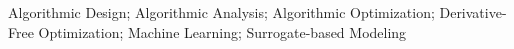\noindent Algorithmic Design; Algorithmic Analysis; Algorithmic Optimization; Derivative-Free Optimization; Machine Learning; Surrogate-based Modeling